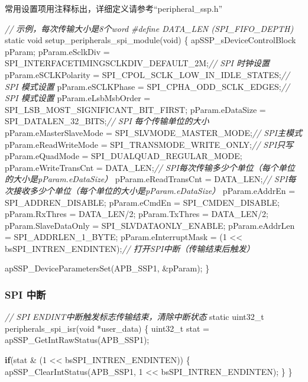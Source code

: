 \documentclass[
  12pt,
]{book}
\newenvironment{Shaded}{\begin{snugshade}}{\end{snugshade}}
\newcommand{\CommentTok}[1]{\textcolor[rgb]{0.56,0.35,0.01}{\textit{#1}}}
\newcommand{\ControlFlowTok}[1]{\textcolor[rgb]{0.13,0.29,0.53}{\textbf{#1}}}
\newcommand{\DataTypeTok}[1]{\textcolor[rgb]{0.13,0.29,0.53}{#1}}
\newcommand{\DecValTok}[1]{\textcolor[rgb]{0.00,0.00,0.81}{#1}}
\newcommand{\NormalTok}[1]{#1}
\newcommand{\PreprocessorTok}[1]{\textcolor[rgb]{0.56,0.35,0.01}{\textit{#1}}}
\begin{document}
常用设置项用注释标出，详细定义请参考``peripheral\_ssp.h''

\begin{Shaded}
\begin{Highlighting}[]
\CommentTok{// 示例，每次传输大小是8个word}
\PreprocessorTok{#define DATA_LEN (SPI_FIFO_DEPTH)}
\DataTypeTok{static} \DataTypeTok{void}\NormalTok{ setup_peripherals_spi_module(}\DataTypeTok{void}\NormalTok{)}
\NormalTok{\{}
\NormalTok{    apSSP_sDeviceControlBlock pParam;}
\NormalTok{    pParam.eSclkDiv = SPI_INTERFACETIMINGSCLKDIV_DEFAULT_2M;}\CommentTok{// SPI 时钟设置}
\NormalTok{    pParam.eSCLKPolarity = SPI_CPOL_SCLK_LOW_IN_IDLE_STATES;}\CommentTok{// SPI 模式设置}
\NormalTok{    pParam.eSCLKPhase = SPI_CPHA_ODD_SCLK_EDGES;}\CommentTok{// SPI 模式设置}
\NormalTok{    pParam.eLsbMsbOrder = SPI_LSB_MOST_SIGNIFICANT_BIT_FIRST;}
\NormalTok{    pParam.eDataSize = SPI_DATALEN_32_BITS;}\CommentTok{// SPI 每个传输单位的大小}
\NormalTok{    pParam.eMasterSlaveMode = SPI_SLVMODE_MASTER_MODE;}\CommentTok{// SPI主模式}
\NormalTok{    pParam.eReadWriteMode = SPI_TRANSMODE_WRITE_ONLY;}\CommentTok{// SPI只写}
\NormalTok{    pParam.eQuadMode = SPI_DUALQUAD_REGULAR_MODE;}
\NormalTok{    pParam.eWriteTransCnt = DATA_LEN;}\CommentTok{// SPI每次传输多少个单位（每个单位的大小是pParam.eDataSize）}
\NormalTok{    pParam.eReadTransCnt = DATA_LEN;}\CommentTok{// SPI每次接收多少个单位（每个单位的大小是pParam.eDataSize）}
\NormalTok{    pParam.eAddrEn = SPI_ADDREN_DISABLE;}
\NormalTok{    pParam.eCmdEn = SPI_CMDEN_DISABLE;}
\NormalTok{    pParam.RxThres = DATA_LEN/}\DecValTok{2}\NormalTok{;}
\NormalTok{    pParam.TxThres = DATA_LEN/}\DecValTok{2}\NormalTok{;}
\NormalTok{    pParam.SlaveDataOnly = SPI_SLVDATAONLY_ENABLE;}
\NormalTok{    pParam.eAddrLen = SPI_ADDRLEN_1_BYTE;}
\NormalTok{    pParam.eInterruptMask = (}\DecValTok{1}\NormalTok{ << bsSPI_INTREN_ENDINTEN);}\CommentTok{// 打开SPI中断（传输结束后触发）}
  
\NormalTok{    apSSP_DeviceParametersSet(APB_SSP1, &pParam);}
\NormalTok{\}}
\end{Highlighting}
\end{Shaded}

\hypertarget{spi-ux4e2dux65ad}{%
\subsubsection{SPI 中断}\label{spi-ux4e2dux65ad}}

\begin{Shaded}
\begin{Highlighting}[]
\CommentTok{// SPI ENDINT中断触发标志传输结束，清除中断状态}
\DataTypeTok{static} \DataTypeTok{uint32_t}\NormalTok{ peripherals_spi_isr(}\DataTypeTok{void}\NormalTok{ *user_data)}
\NormalTok{\{}
  \DataTypeTok{uint32_t}\NormalTok{ stat = apSSP_GetIntRawStatus(APB_SSP1);}
  
  \ControlFlowTok{if}\NormalTok{(stat & (}\DecValTok{1}\NormalTok{ << bsSPI_INTREN_ENDINTEN))}
\NormalTok{  \{}
\NormalTok{    apSSP_ClearIntStatus(APB_SSP1, }\DecValTok{1}\NormalTok{ << bsSPI_INTREN_ENDINTEN);}
\NormalTok{  \}  }
\NormalTok{\}}
\end{Highlighting}
\end{Shaded}
\end{document}

